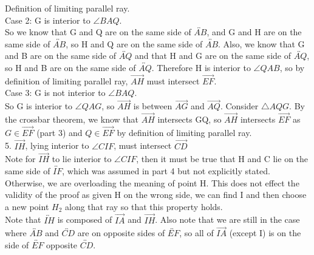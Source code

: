 \documentclass[12pt,letterpaper]{article}
\begin{document}
Definition of limiting parallel ray. \\

\noindent Case 2: G is interior to $\angle BAQ$.\\

So we know that G and Q are on the same side of $\overleftrightarrow{AB}$, and G and H are on the same side of $\overleftrightarrow{AB}$, so H and Q are on the same side of $\overleftrightarrow{AB}$.  Also, we know that G and B are on the same side of $\overleftrightarrow{AQ}$ and that H and G are on the same side of $\overleftrightarrow{AQ}$, so H and B are on the same side of $\overleftrightarrow{AQ}$.  Therefore H is interior to $\angle QAB$, so by definition of limiting parallel ray, $\overrightarrow{AH}$ must intersect $\overrightarrow{EF}$. \\

\noindent Case 3: G is not interior to $\angle BAQ$. \\

So G is interior to $\angle QAG$, so $\overrightarrow{AH}$ is between $\overrightarrow{AG}$ and $\overrightarrow{AQ}$.  Consider $\triangle AQG$.  By the crossbar theorem, we know that $\overrightarrow{AH}$ intersects GQ, so $\overrightarrow{AH}$ intersects $\overrightarrow{EF}$ as $G\in \overrightarrow{EF}$ (part 3) and $Q\in \overrightarrow{EF}$ by definition of limiting parallel ray.  \\




5. $\overrightarrow{IH}$, lying interior to $\angle CIF$, must intersect $\overrightarrow{CD}$\\

Note for $\overrightarrow{IH}$ to lie interior to $\angle CIF$, then it must be true that H and C lie on the same side of $\overleftrightarrow{IF}$, which was assumed in part 4 but not explicitly stated. Otherwise, we are overloading the meaning of point H.  This does not effect the validity of the proof as given H on the wrong side, we can find I and then choose a new point $H_2$ along that ray so that this property holds.\\

Note that $\overleftrightarrow{IH}$ is composed of $\overrightarrow{IA}$ and $\overrightarrow{IH}$. Also note that we are still in the case where $\overleftrightarrow{AB}$ and $\overleftrightarrow{CD}$ are on opposite sides of $\overleftrightarrow{EF}$, so all of $\overrightarrow{IA}$ (except I) is on the side of $\overleftrightarrow{EF}$ opposite $\overleftrightarrow{CD}$.  \\
\end{document}
